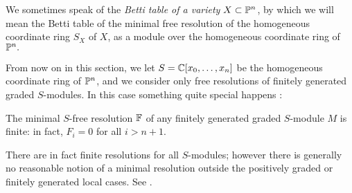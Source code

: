 We sometimes speak of the \emph{Betti table of a variety $X\subset {\mathbb P}^{n}$}, by which we will mean the Betti table of the minimal free resolution
of the homogeneous coordinate ring $S_{X}$ of $X$, as a module over the homogeneous coordinate ring of ${\mathbb P}^{n}.$


From now on in this section, we let $S = {\mathbb C}[x_{0},\dots, x_{n}]$ be the homogeneous coordinate ring of ${\mathbb P}^{n}$, and we consider only free resolutions of finitely generated graded $S$-modules. In this case something quite special happens \cite[****]{E}:

\begin{theorem}\label{hst}
The minimal $S$-free resolution ${\mathbb F}$ of any finitely generated graded $S$-module $M$ is finite: in fact, $F_{i}=0$ for all $i>n+1$.
\end{theorem}

\begin{fact}
 There are in fact finite resolutions for all $S$-modules; however there is generally no reasonable notion of a  minimal resolution outside the positively graded or finitely generated local cases. See \cite{???}.
\end{fact}

